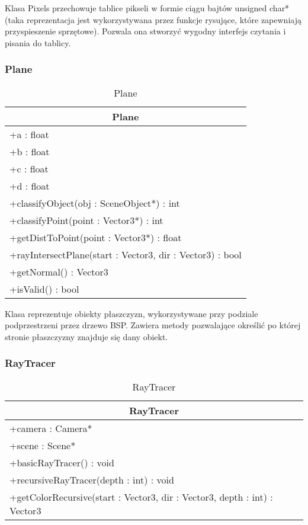 Klasa Pixels przechowuje tablice pikseli w formie ciągu bajtów unsigned char* (taka reprezentacja jest wykorzystywana przez funkcje rysujące, które zapewniają przyspieszenie sprzętowe). Pozwala ona stworzyć wygodny interfejs czytania i pisania do tablicy. 

\subsubsection{Plane}

\footnotesize
\begin{longtable}{|p{14cm}|}
    \caption{Plane} \label{tab:Plane} \\ \hline
    \multicolumn{1}{|c|}{Plane} \\ \hline
    +a : float \\ 
    +b : float \\
    +c : float \\
    +d : float \\
    \hline
	+classifyObject(obj : SceneObject*) : int \\
	+classifyPoint(point : Vector3*) : int \\
	+getDistToPoint(point : Vector3*) : float \\
	+rayIntersectPlane(start : Vector3, dir : Vector3) : bool \\
	+getNormal() : Vector3 \\
	+isValid() : bool \\
	\hline
\end{longtable}
\normalsize

Klasa reprezentuje obiekty płaszczyzn, wykorzystywane przy podziale podprzestrzeni przez drzewo BSP. Zawiera metody pozwalające określić po której stronie płaszczyzny znajduje się dany obiekt.

\subsubsection{RayTracer}

\footnotesize
\begin{longtable}{|p{14cm}|}
    \caption{RayTracer} \label{tab:RayTracer} \\ \hline
    \multicolumn{1}{|c|}{RayTracer} \\ \hline
    +camera : Camera* \\
    +scene : Scene* \\ \hline
	+basicRayTracer() : void \\
	+recursiveRayTracer(depth : int) : void \\
	+getColorRecursive(start : Vector3, dir : Vector3, depth : int) : Vector3 \\
	\hline
\end{longtable}
\normalsize

